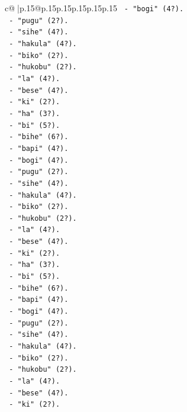 \documentclass{article}
\begin{document}
{\begin{supertabular}{c@{$\;$}|p{.15\linewidth}@{}p{.15\linewidth}p{.15\linewidth}p{.15\linewidth}p{.15\linewidth}p{.15\linewidth}}
{{{\texttt{       {-} "bogi" (4?).} \\
\texttt{       {-} "pugu" (2?).} \\
\texttt{       {-} "sihe" (4?).} \\
\texttt{       {-} "hakula" (4?).} \\
\texttt{       {-} "biko" (2?).} \\
\texttt{       {-} "hukobu" (2?).} \\
\texttt{       {-} "la" (4?).} \\
\texttt{       {-} "bese" (4?).} \\
\texttt{       {-} "ki" (2?).} \\
\texttt{       {-} "ha" (3?).} \\
\texttt{       {-} "bi" (5?).} \\
\texttt{       {-} "bihe" (6?).} \\
\texttt{       {-} "bapi" (4?).} \\
\texttt{       {-} "bogi" (4?).} \\
\texttt{       {-} "pugu" (2?).} \\
\texttt{       {-} "sihe" (4?).} \\
\texttt{       {-} "hakula" (4?).} \\
\texttt{       {-} "biko" (2?).} \\
\texttt{       {-} "hukobu" (2?).} \\
\texttt{       {-} "la" (4?).} \\
\texttt{       {-} "bese" (4?).} \\
\texttt{       {-} "ki" (2?).} \\
\texttt{       {-} "ha" (3?).} \\
\texttt{       {-} "bi" (5?).} \\
\texttt{       {-} "bihe" (6?).} \\
\texttt{       {-} "bapi" (4?).} \\
\texttt{       {-} "bogi" (4?).} \\
\texttt{       {-} "pugu" (2?).} \\
\texttt{       {-} "sihe" (4?).} \\
\texttt{       {-} "hakula" (4?).} \\
\texttt{       {-} "biko" (2?).} \\
\texttt{       {-} "hukobu" (2?).} \\
\texttt{       {-} "la" (4?).} \\
\texttt{       {-} "bese" (4?).} \\
\texttt{       {-} "ki" (2?).} \\
}}}
\end{supertabular}}
\end{document}
